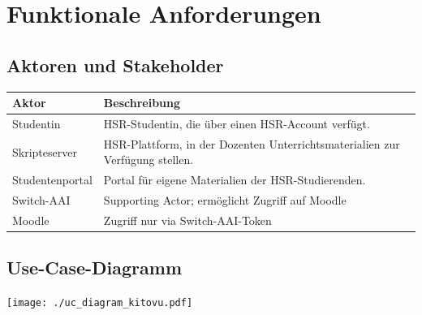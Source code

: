 \documentclass[a4paper]{article}
\let\oldsection\section
\renewcommand\section{\clearpage\oldsection}
\begin{document}
\begin{landscape}
\end{landscape}

\pagebreak
\section{Funktionale Anforderungen}

\subsection{Aktoren und Stakeholder}

\begin{tabulary}{\linewidth}{lL}
	\toprule
	Aktor & Beschreibung\\
	\midrule
	Studentin & HSR-Studentin, die über einen HSR-Account verfügt.\\
	Skripteserver & HSR-Plattform, in der Dozenten Unterrichtsmaterialien zur Verfügung stellen.\\
	Studentenportal & Portal für eigene Materialien der HSR-Studierenden.\\
	Switch-AAI & Supporting Actor; ermöglicht Zugriff auf Moodle \\	
	Moodle & Zugriff nur via Switch-AAI-Token\\
	
	\bottomrule
\end{tabulary}

\subsection{Use-Case-Diagramm}


\texttt{[image: ./uc\_diagram\_kitovu.pdf]}
\end{document}
